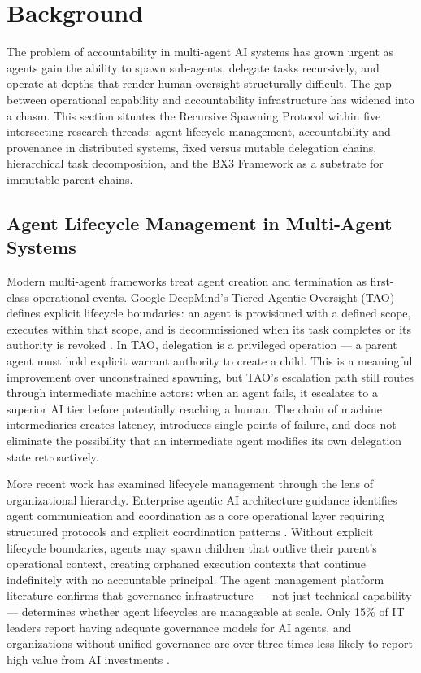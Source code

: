 \section{Background}
\label{sec:background}

The problem of accountability in multi-agent AI systems has grown urgent as agents gain the ability to spawn sub-agents, delegate tasks recursively, and operate at depths that render human oversight structurally difficult. The gap between operational capability and accountability infrastructure has widened into a chasm. This section situates the Recursive Spawning Protocol within five intersecting research threads: agent lifecycle management, accountability and provenance in distributed systems, fixed versus mutable delegation chains, hierarchical task decomposition, and the BX3 Framework as a substrate for immutable parent chains.

\subsection{Agent Lifecycle Management in Multi-Agent Systems}
\label{sec:lifecycle-management}

Modern multi-agent frameworks treat agent creation and termination as first-class operational events. Google DeepMind's Tiered Agentic Oversight (TAO) defines explicit lifecycle boundaries: an agent is provisioned with a defined scope, executes within that scope, and is decommissioned when its task completes or its authority is revoked \cite{tao2025}. In TAO, delegation is a privileged operation — a parent agent must hold explicit warrant authority to create a child. This is a meaningful improvement over unconstrained spawning, but TAO's escalation path still routes through intermediate machine actors: when an agent fails, it escalates to a superior AI tier before potentially reaching a human. The chain of machine intermediaries creates latency, introduces single points of failure, and does not eliminate the possibility that an intermediate agent modifies its own delegation state retroactively.

More recent work has examined lifecycle management through the lens of organizational hierarchy. Enterprise agentic AI architecture guidance identifies agent communication and coordination as a core operational layer requiring structured protocols and explicit coordination patterns \cite{enterprise2025}. Without explicit lifecycle boundaries, agents may spawn children that outlive their parent's operational context, creating orphaned execution contexts that continue indefinitely with no accountable principal. The agent management platform literature confirms that governance infrastructure — not just technical capability — determines whether agent lifecycles are manageable at scale. Only 15\% of IT leaders report having adequate governance models for AI agents, and organizations without unified governance are over three times less likely to report high value from AI investments \cite{kore2025}.

